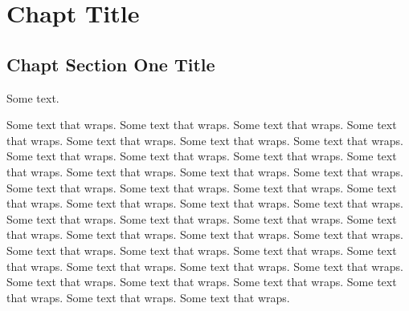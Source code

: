 \chapter{Chapt Title}\label{chap:chapt}

\section{Chapt Section One Title}

Some text.

Some text that wraps. 
Some text that wraps. 
Some text that wraps. 
Some text that wraps. 
Some text that wraps. 
Some text that wraps. 
Some text that wraps. 
Some text that wraps. 
Some text that wraps. 
Some text that wraps. 
Some text that wraps. 
Some text that wraps. 
Some text that wraps. 
Some text that wraps. 
Some text that wraps. 
Some text that wraps. 
Some text that wraps. 
Some text that wraps. 
Some text that wraps. 
Some text that wraps. 
Some text that wraps. 
Some text that wraps. 
Some text that wraps. 
Some text that wraps. 
Some text that wraps. 
Some text that wraps. 
Some text that wraps. 
Some text that wraps. 
Some text that wraps. 
Some text that wraps. 
Some text that wraps. 
Some text that wraps. 
Some text that wraps. 
Some text that wraps. 
Some text that wraps. 
Some text that wraps. 
Some text that wraps. 
Some text that wraps. 
Some text that wraps. 
Some text that wraps. 
Some text that wraps. 
